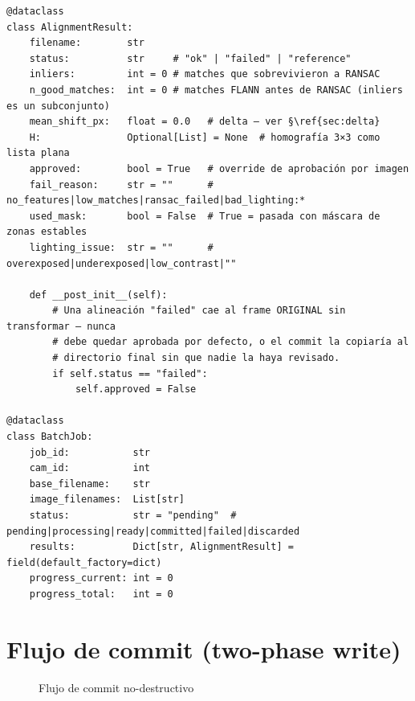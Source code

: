 \begin{codebox}
\begin{verbatim}
@dataclass
class AlignmentResult:
    filename:        str
    status:          str     # "ok" | "failed" | "reference"
    inliers:         int = 0 # matches que sobrevivieron a RANSAC
    n_good_matches:  int = 0 # matches FLANN antes de RANSAC (inliers es un subconjunto)
    mean_shift_px:   float = 0.0   # delta — ver §\ref{sec:delta}
    H:               Optional[List] = None  # homografía 3×3 como lista plana
    approved:        bool = True   # override de aprobación por imagen
    fail_reason:     str = ""      # no_features|low_matches|ransac_failed|bad_lighting:*
    used_mask:       bool = False  # True = pasada con máscara de zonas estables
    lighting_issue:  str = ""      # overexposed|underexposed|low_contrast|""

    def __post_init__(self):
        # Una alineación "failed" cae al frame ORIGINAL sin transformar — nunca
        # debe quedar aprobada por defecto, o el commit la copiaría al
        # directorio final sin que nadie la haya revisado.
        if self.status == "failed":
            self.approved = False

@dataclass
class BatchJob:
    job_id:           str
    cam_id:           int
    base_filename:    str
    image_filenames:  List[str]
    status:           str = "pending"  # pending|processing|ready|committed|failed|discarded
    results:          Dict[str, AlignmentResult] = field(default_factory=dict)
    progress_current: int = 0
    progress_total:   int = 0
\end{verbatim}
\end{codebox}

\section{Flujo de commit (two-phase write)}

\begin{figure}[H]
\centering
{}
\caption{Flujo de commit no-destructivo}
\end{figure}

